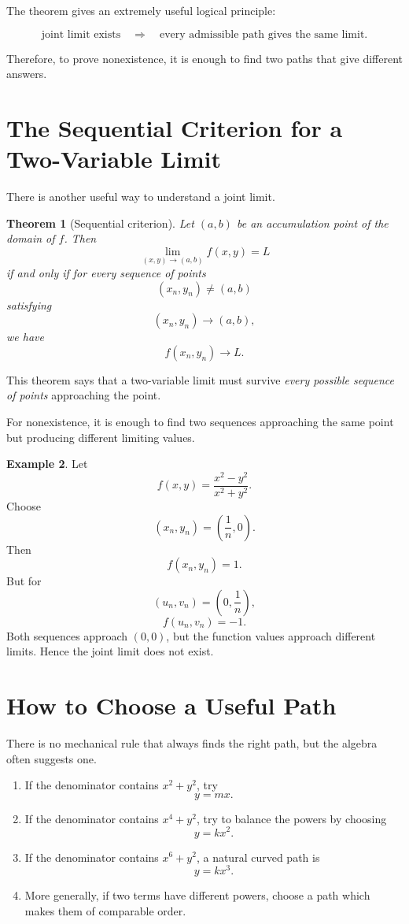 \documentclass[11pt,oneside]{book}
\theoremstyle{studentthm}
\newtheorem{theorem}{Theorem}[chapter]
\theoremstyle{definition}
\newtheorem{example}[theorem]{Example}
\begin{document}
The theorem gives an extremely useful logical principle:

\[
\text{joint limit exists}
\quad\Longrightarrow\quad
\text{every admissible path gives the same limit}.
\]

Therefore, to prove nonexistence, it is enough to find two paths that
give different answers.

\section{The Sequential Criterion for a Two-Variable Limit}

There is another useful way to understand a joint limit.

\begin{theorem}[Sequential criterion]
Let \((a,b)\) be an accumulation point of the domain of \(f\). Then
\[
\lim_{(x,y)\to(a,b)}f(x,y)=L
\]
if and only if for every sequence of points
\[
(x_n,y_n)\ne(a,b)
\]
satisfying
\[
(x_n,y_n)\to(a,b),
\]
we have
\[
f(x_n,y_n)\to L.
\]
\end{theorem}

This theorem says that a two-variable limit must survive \emph{every
possible sequence of points} approaching the point.

For nonexistence, it is enough to find two sequences approaching the
same point but producing different limiting values.

\begin{example}
Let
\[
f(x,y)=\frac{x^2-y^2}{x^2+y^2}.
\]
Choose
\[
(x_n,y_n)=\left(\frac1n,0\right).
\]
Then
\[
f(x_n,y_n)=1.
\]
But for
\[
(u_n,v_n)=\left(0,\frac1n\right),
\]
\[
f(u_n,v_n)=-1.
\]
Both sequences approach \((0,0)\), but the function values approach
different limits. Hence the joint limit does not exist.
\end{example}

\section{How to Choose a Useful Path}

There is no mechanical rule that always finds the right path, but the
algebra often suggests one.

\begin{enumerate}
\item If the denominator contains \(x^2+y^2\), try
\[
y=mx.
\]

\item If the denominator contains \(x^4+y^2\), try to balance the
powers by choosing
\[
y=kx^2.
\]

\item If the denominator contains \(x^6+y^2\), a natural curved path is
\[
y=kx^3.
\]

\item More generally, if two terms have different powers, choose a path
which makes them of comparable order.
\end{enumerate}
\end{document}
